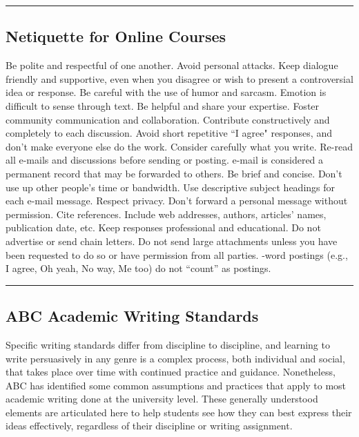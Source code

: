\vspace{2ex}\hrule\vspace{2ex}




\subsection*{Netiquette for Online Courses}
\begin{outline}
	\1	Be polite and respectful of one another.
	\1	Avoid personal attacks. Keep dialogue friendly and supportive, even when you disagree or wish to present a controversial idea or response.
	\1	Be careful with the use of humor and sarcasm. Emotion is difficult to sense through text.
	\1	Be helpful and share your expertise. Foster community communication and collaboration.
	\1	Contribute constructively and completely to each discussion. Avoid short repetitive ``I agree" responses, and don’t make everyone else do the work.
	\1	Consider carefully what you write. Re-read all e-mails and discussions before sending or posting.
	\1	e-mail is considered a permanent record that may be forwarded to others.
	\1	Be brief and concise. Don’t use up other people’s time or bandwidth.
	\1	Use descriptive subject headings for each e-mail message.
	\1	Respect privacy. Don’t forward a personal message without permission.
	\1	Cite references. Include web addresses, authors, articles' names, publication date, etc.
	\1	Keep responses professional and educational. Do not advertise or send chain letters.
	\1	Do not send large attachments unless you have been requested to do so or have permission from all parties.
	-word postings (e.g., I agree, Oh yeah, No way, Me too) do not ``count'' as postings.
\end{outline}

\vspace{2ex}\hrule\vspace{2ex}



\subsection*{ABC Academic Writing Standards}
Specific writing standards differ from discipline to discipline, and learning to write persuasively in any genre is a complex process, both individual and social, that takes place over time with continued practice and guidance.  Nonetheless, ABC has identified some common assumptions and practices that apply to most academic writing done at the university level.  These generally understood elements are articulated here to help students see how they can best express their ideas effectively, regardless of their discipline or writing assignment. \\
 
